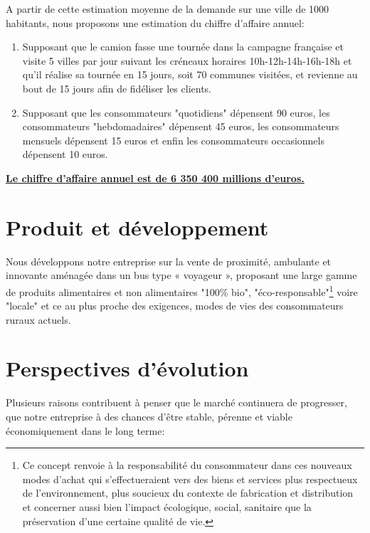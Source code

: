 \documentclass[12pt,a4paper]{report}
\begin{document}
\begin{tcolorbox}[colback=green!5!white, colframe=green!75!black]
	A partir de cette estimation moyenne de la demande sur une ville de 1000 habitants, nous proposons une estimation du chiffre d'affaire annuel:
	
	\begin{enumerate}
		\item Supposant que le camion fasse une tournée dans la campagne française et visite 5 villes par jour suivant les créneaux horaires 10h-12h-14h-16h-18h et qu'il réalise sa tournée en 15 jours, soit 70 communes visitées, et revienne au bout de 15 jours afin de fidéliser les clients.
		\item Supposant que les consommateurs "quotidiens"  dépensent 90 euros, les consommateurs "hebdomadaires" dépensent 45 euros, les consommateurs mensuels dépensent 15 euros et enfin les consommateurs occasionnels dépensent 10 euros.
	\end{enumerate}
	\vspace{0.5cm}
	\textbf{\color{green}\underline{Le chiffre d'affaire annuel est de 6 350 400 millions d'euros.}}
\end{tcolorbox}




	
	
				\section{Produit et développement}
				
				
Nous développons notre entreprise sur la vente de proximité, ambulante et innovante aménagée dans un bus type « voyageur », proposant une large gamme de produits alimentaires et non alimentaires "100\% bio", "éco-responsable"\footnote{Ce concept renvoie à la responsabilité du consommateur dans ces nouveaux modes d’achat qui s’effectueraient vers des biens et services plus respectueux de l’environnement, plus soucieux du contexte de fabrication et distribution et concerner aussi bien l’impact écologique, social, sanitaire que la préservation d’une certaine qualité de vie. } voire "locale" et ce au plus proche des exigences, modes de vies des consommateurs ruraux actuels. 
	
	
					\section{Perspectives d'évolution}

Plusieurs raisons contribuent à penser que le marché continuera de progresser, que notre entreprise à des chances d'être stable, pérenne et viable économiquement dans le long terme:
\end{document}
